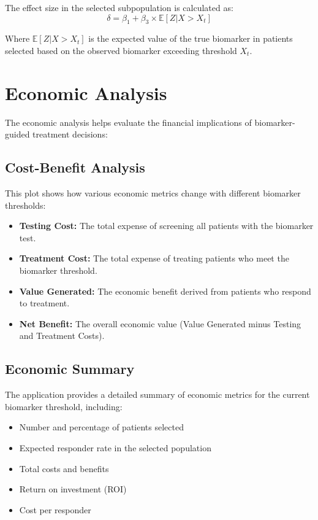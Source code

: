 \documentclass{article}
\begin{document}
The effect size in the selected subpopulation is calculated as:
\begin{equation}
\delta = \beta_1 + \beta_3 \times \mathbb{E}[Z|X > X_t]
\end{equation}

Where $\mathbb{E}[Z|X > X_t]$ is the expected value of the true biomarker in patients selected based on the observed biomarker exceeding threshold $X_t$.

\section{Economic Analysis}

The economic analysis helps evaluate the financial implications of biomarker-guided treatment decisions:

\subsection{Cost-Benefit Analysis}

This plot shows how various economic metrics change with different biomarker thresholds:

\begin{itemize}
    \item \textbf{Testing Cost:} The total expense of screening all patients with the biomarker test.
    
    \item \textbf{Treatment Cost:} The total expense of treating patients who meet the biomarker threshold.
    
    \item \textbf{Value Generated:} The economic benefit derived from patients who respond to treatment.
    
    \item \textbf{Net Benefit:} The overall economic value (Value Generated minus Testing and Treatment Costs).
\end{itemize}

\subsection{Economic Summary}

The application provides a detailed summary of economic metrics for the current biomarker threshold, including:

\begin{itemize}
    \item Number and percentage of patients selected
    \item Expected responder rate in the selected population
    \item Total costs and benefits
    \item Return on investment (ROI)
    \item Cost per responder
\end{itemize}
\end{document}
